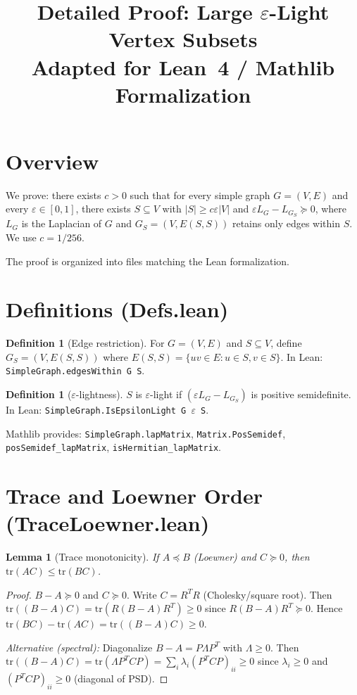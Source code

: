\documentclass{article}
\title{Detailed Proof: Large $\varepsilon$-Light Vertex Subsets\\
\normalsize Adapted for Lean~4 / Mathlib Formalization}
\date{}
\newtheorem{lemma}[theorem]{Lemma}
\theoremstyle{definition}
\newtheorem{definition}[theorem]{Definition}
\begin{document}
\maketitle

\section{Overview}

We prove: there exists $c > 0$ such that for every simple graph $G = (V,E)$ and every
$\varepsilon \in [0,1]$, there exists $S \subseteq V$ with $|S| \ge c\varepsilon|V|$ and
$\varepsilon L_G - L_{G_S} \succeq 0$, where $L_G$ is the Laplacian of $G$ and
$G_S = (V, E(S,S))$ retains only edges within $S$. We use $c = 1/256$.

The proof is organized into files matching the Lean formalization.

\section{Definitions (Defs.lean)}

\begin{definition}[Edge restriction]
For $G = (V,E)$ and $S \subseteq V$, define
$G_S = (V, E(S,S))$ where $E(S,S) = \{uv \in E : u \in S, v \in S\}$.
In Lean: \texttt{SimpleGraph.edgesWithin G S}.
\end{definition}

\begin{definition}[$\varepsilon$-lightness]
$S$ is $\varepsilon$-light if $(\varepsilon L_G - L_{G_S})$ is positive semidefinite.
In Lean: \texttt{SimpleGraph.IsEpsilonLight G $\varepsilon$ S}.
\end{definition}

Mathlib provides: \texttt{SimpleGraph.lapMatrix}, \texttt{Matrix.PosSemidef},
\texttt{posSemidef\_lapMatrix}, \texttt{isHermitian\_lapMatrix}.

\section{Trace and Loewner Order (TraceLoewner.lean)}

\begin{lemma}[Trace monotonicity]\label{lem:tracemono}
If $A \preceq B$ (Loewner) and $C \succeq 0$, then $\mathrm{tr}(AC) \le \mathrm{tr}(BC)$.
\end{lemma}
\begin{proof}
$B - A \succeq 0$ and $C \succeq 0$. Write $C = R^T R$ (Cholesky/square root).
Then $\mathrm{tr}((B-A)C) = \mathrm{tr}(R(B-A)R^T) \ge 0$ since $R(B-A)R^T \succeq 0$.
Hence $\mathrm{tr}(BC) - \mathrm{tr}(AC) = \mathrm{tr}((B-A)C) \ge 0$.

\emph{Alternative (spectral):} Diagonalize $B - A = P\Lambda P^T$ with $\Lambda \ge 0$.
Then $\mathrm{tr}((B-A)C) = \mathrm{tr}(\Lambda P^T C P) = \sum_i \lambda_i (P^T C P)_{ii} \ge 0$
since $\lambda_i \ge 0$ and $(P^T C P)_{ii} \ge 0$ (diagonal of PSD).
\end{proof}
\end{document}
